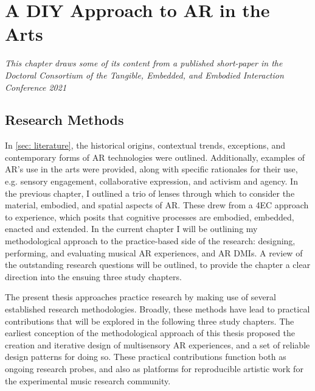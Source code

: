 \chapter{A DIY Approach to AR in the Arts}
\label{sec: method}
\epigraph{\emph{This chapter draws some of its content from a published short-paper in the Doctoral Consortium of the Tangible, Embedded, and Embodied Interaction Conference 2021}}{\citep[]{bilbow2021b}}



\section{Research Methods}\label{sec: method-methods} %
In \autoref{sec: literature}, the historical origins, contextual trends, exceptions, and contemporary forms of AR technologies were outlined. Additionally, examples of AR's use in the arts were provided, along with specific rationales for their use, e.g. sensory engagement, collaborative expression, and activism and agency. In the previous chapter, I outlined a trio of lenses through which to consider the material, embodied, and spatial aspects of AR. These drew from a 4EC approach to experience, which posits that cognitive processes are embodied, embedded, enacted and extended. In the current chapter I will be outlining my methodological approach to the practice-based side of the research: designing, performing, and evaluating musical AR experiences, and AR DMIs. A review of the outstanding research questions will be outlined, to provide the chapter a clear direction into the ensuing three study chapters.

\begin{enumerate}
    \RQmedium
    \RQexperience
    \RQfuture
\end{enumerate}

The present thesis approaches practice research by making use of several established research methodologies. Broadly, these methods have lead to practical contributions that will be explored in the following three study chapters. The earliest conception of the methodological approach of this thesis proposed the creation and iterative design of multisensory AR experiences, and a set of reliable design patterns for doing so. These practical contributions function both as ongoing research probes, and also as platforms for reproducible artistic work for the experimental music research community. 

